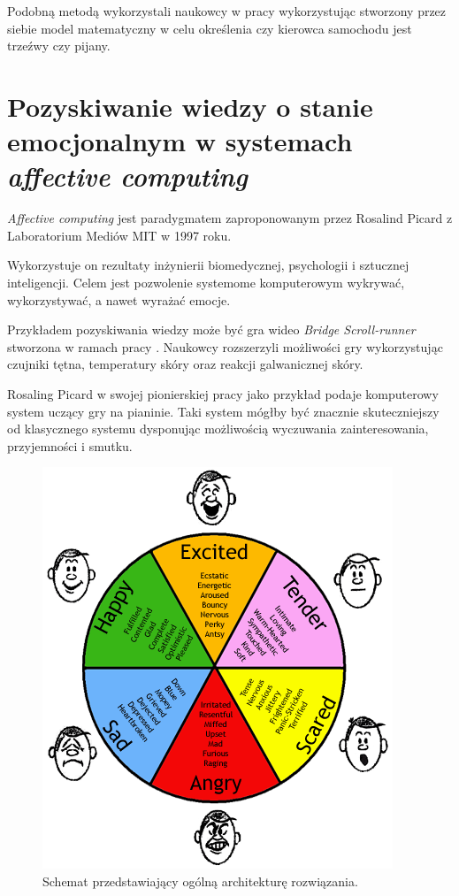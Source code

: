 Podobną metodą wykorzystali naukowcy w pracy \cite{dai2010mobile} wykorzystując stworzony przez siebie model matematyczny w celu określenia czy kierowca samochodu jest trzeźwy czy pijany.



\section{Pozyskiwanie wiedzy o stanie emocjonalnym w systemach \textit{affective computing}}
\label{sec:pozyskiwanieWiedzyOStanieEmocjonalnymWSystemachAffectiveComputing}

\textit{Affective computing} jest paradygmatem zaproponowanym przez Rosalind Picard z Laboratorium Mediów MIT w 1997 roku\cite{picard1997affective}.

Wykorzystuje on rezultaty inżynierii biomedycznej, psychologii i sztucznej inteligencji. Celem jest pozwolenie systemome komputerowym wykrywać, wykorzystywać, a nawet wyrażać emocje\cite{nalepa2017affective}.

Przykładem pozyskiwania wiedzy może być gra wideo \textit{Bridge Scroll-runner} stworzona w ramach pracy \cite{nalepa2017affective}. Naukowcy rozszerzyli możliwości gry wykorzystując czujniki tętna, temperatury skóry oraz reakcji galwanicznej skóry.

Rosaling Picard w swojej pionierskiej pracy \cite{picard1997affective} jako przykład podaje komputerowy system uczący gry na pianinie. Taki system mógłby być znacznie skuteczniejszy od klasycznego systemu dysponując możliwością wyczuwania zainteresowania, przyjemności i smutku.

\begin{figure}[H]
	\centering
	\includegraphics[scale=1]{rozdzial2/ModelEkmana.png}
	\caption{Schemat przedstawiający ogólną architekturę rozwiązania.}
\end{figure}

